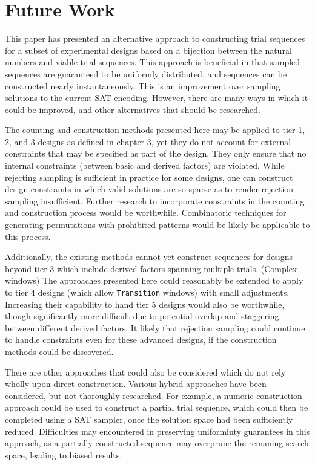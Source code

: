 
\chapter{Future Work}

This paper has presented an alternative approach to constructing trial sequences for a subset of experimental designs based on a bijection between the natural numbers and viable trial sequences. This approach is beneficial in that sampled sequences are guaranteed to be uniformly distributed, and sequences can be constructed nearly instantaneously. This is an improvement over sampling solutions to the current SAT encoding. However, there are many ways in which it could be improved, and other alternatives that should be researched.

The counting and construction methods presented here may be applied to tier 1, 2, and 3 designs as defined in chapter 3, yet they do not account for external constraints that may be specified as part of the design. They only ensure that no internal constraints (between basic and derived factors) are violated. While rejecting sampling is sufficient in practice for some designs, one can construct design constraints in which valid solutions are so sparse as to render rejection sampling insufficient. Further research to incorporate constraints in the counting and construction process would be worthwhile. Combinatoric techniques for generating permutations with prohibited patterns would be likely be applicable to this process.

Additionally, the existing methods cannot yet construct sequences for designs beyond tier 3 which include derived factors spanning multiple trials. (Complex windows) The approaches presented here could reasonably be extended to apply to tier 4 designs (which allow \texttt{Transition} windows) with small adjustments. Increasing their capability to hand tier 5 designs would also be worthwhile, though significantly more difficult due to potential overlap and staggering between different derived factors. It likely that rejection sampling could continue to handle constraints even for these advanced designs, if the construction methods could be discovered.

There are other approaches that could also be considered which do not rely wholly upon direct construction. Various hybrid approaches have been considered, but not thoroughly researched. For example, a numeric construction approach could be used to construct a partial trial sequence, which could then be completed using a SAT sampler, once the solution space had been sufficiently reduced. Difficulties may encountered in preserving uniforminty guarantees in this approach, as a partially constructed sequence may overprune the remaning search space, leading to biased results.

